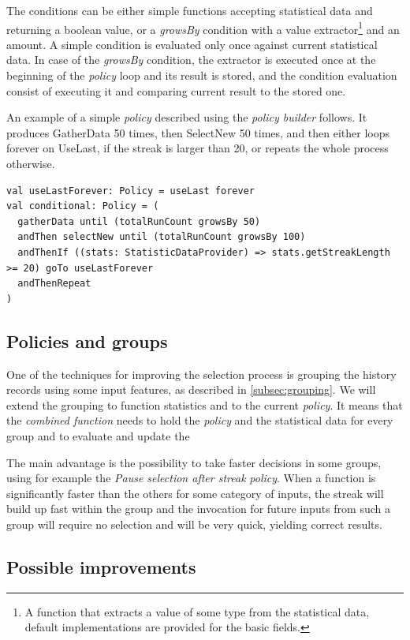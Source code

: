The conditions can be either simple functions accepting statistical data and returning a boolean value, or a \textit{growsBy} condition with a value extractor\footnote{A function that extracts a value of some type from the statistical data, default implementations are provided for the basic fields.} and an amount. A simple condition is evaluated only once against current statistical data. In case of the \textit{growsBy} condition, the extractor is executed once at the beginning of the \textit{policy} loop and its result is stored, and the condition evaluation consist of executing it and comparing current result to the stored one.

An example of a simple \textit{policy} described using the \textit{policy builder} follows. It produces GatherData 50 times, then SelectNew 50 times, and then either loops forever on UseLast, if the streak is larger than 20, or repeats the whole process otherwise.

\lstset{style=Scala}
\begin{lstlisting}
val useLastForever: Policy = useLast forever
val conditional: Policy = (
  gatherData until (totalRunCount growsBy 50)
  andThen selectNew until (totalRunCount growsBy 100)
  andThenIf ((stats: StatisticDataProvider) => stats.getStreakLength >= 20) goTo useLastForever
  andThenRepeat
)
\end{lstlisting}

\subsection{Policies and groups}

One of the techniques for improving the selection process is grouping the history records using some input features, as described in \ref{subsec:grouping}. We will extend the grouping to function statistics and to the current \textit{policy}. It means that the \textit{combined function} needs to hold the \textit{policy} and the statistical data for every group and to evaluate and update the 

The main advantage is the possibility to take faster decisions in some groups, using for example the \textit{Pause selection after streak} \textit{policy}. When a function is significantly faster than the others for some category of inputs, the streak will build up fast within the group and the invocation for future inputs from such a group will require no selection and will be very quick, yielding correct results.

\subsection{Possible improvements}
\label{subsec:policy_improvements}

